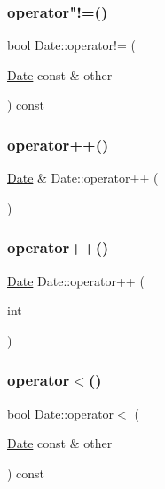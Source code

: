 \subsubsection{\texorpdfstring{operator"!=()}{operator!=()}}
{\footnotesize\ttfamily bool Date\+::operator!= (\begin{DoxyParamCaption}\item[{\hyperlink{classDate}{Date} const \&}]{other }\end{DoxyParamCaption}) const}

\mbox{\label{classDate_a3993e645e3408e07d12b70e58f36630c}} 
\subsubsection{\texorpdfstring{operator++()}{operator++()}\hspace{0.1cm}{\footnotesize\ttfamily [1/2]}}
{\footnotesize\ttfamily \hyperlink{classDate}{Date} \& Date\+::operator++ (\begin{DoxyParamCaption}{ }\end{DoxyParamCaption})}

\mbox{\label{classDate_a63f7060a7a7997e289e5e885f84557e5}} 
\subsubsection{\texorpdfstring{operator++()}{operator++()}\hspace{0.1cm}{\footnotesize\ttfamily [2/2]}}
{\footnotesize\ttfamily \hyperlink{classDate}{Date} Date\+::operator++ (\begin{DoxyParamCaption}\item[{int}]{ }\end{DoxyParamCaption})}

\mbox{\label{classDate_a074316aeb377c6c1ea828b2642b39153}} 
\subsubsection{\texorpdfstring{operator$<$()}{operator<()}}
{\footnotesize\ttfamily bool Date\+::operator$<$ (\begin{DoxyParamCaption}\item[{\hyperlink{classDate}{Date} const \&}]{other }\end{DoxyParamCaption}) const}

